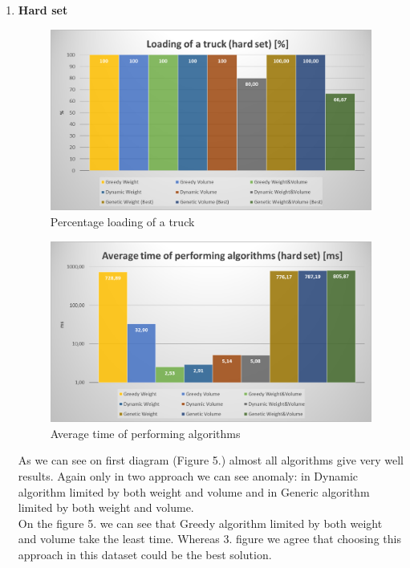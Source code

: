 \documentclass[conference,compsoc]{IEEEtran}
\begin{document}
\begin{enumerate}
\item \textbf{Hard set}

\begin{figure}[H]
  \centering
  \includegraphics[width=\columnwidth]{image023.png}
  \caption{Percentage loading of a truck }
\end{figure}

\begin{figure}[H]
  \centering
  \includegraphics[width=\columnwidth]{image029.png}
  \caption{Average time of performing algorithms}
\end{figure}

As we can see on first diagram (Figure 5.) almost all algorithms give very well results. Again only in two approach we can see anomaly: in Dynamic algorithm limited by both weight and volume and in Generic algorithm limited by both weight and volume.\\

On the figure 5. we can see that Greedy algorithm limited by both weight and volume take the least time. Whereas 3. figure we agree that choosing this approach in this dataset could be the best solution.\\


\end{enumerate}
\end{document}
